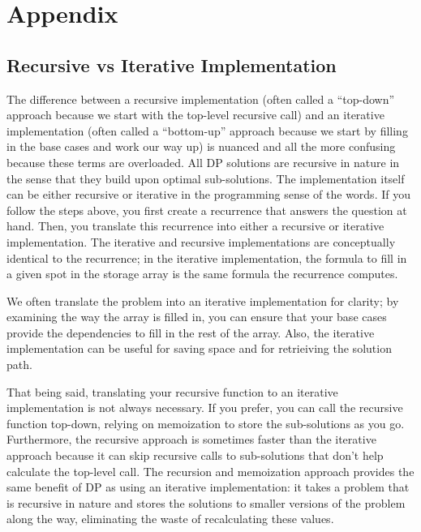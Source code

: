 \documentclass[11pt]{article}
\begin{document}
\setcounter{section}{1}
\renewcommand{\thesection}{\Alph{section}}
\section*{Appendix}
\subsection{Recursive vs Iterative Implementation}
\label{sec:implementation}
The difference between a recursive implementation (often called a ``top-down'' approach because we start with the top-level recursive call) and an iterative implementation (often called a ``bottom-up'' approach because we start by filling in the base cases and work our way up) is nuanced and all the more confusing because these terms are overloaded. All DP solutions are recursive in nature in the sense that they build upon optimal sub-solutions. The implementation itself can be either recursive or iterative in the programming sense of the words. If you follow the steps above, you first create a recurrence that answers the question at hand. Then, you translate this recurrence into either a recursive or iterative implementation. The iterative and recursive implementations are conceptually identical to the recurrence; in the iterative implementation, the formula to fill in a given spot in the storage array is the same formula the recurrence computes. 

We often translate the problem into an iterative implementation for clarity; by examining the way the array is filled in, you can ensure that your base cases provide the dependencies to fill in the rest of the array. Also, the iterative implementation can be useful for saving space and for retrieiving the solution path. 

That being said, translating your recursive function to an iterative implementation is not always necessary. If you prefer, you can call the recursive function top-down, relying on memoization to store the sub-solutions as you go. Furthermore, the recursive approach is sometimes faster than the iterative approach because it can skip recursive calls to sub-solutions that don't help calculate the top-level call. The recursion and memoization approach provides the same benefit of DP as using an iterative implementation: it takes a problem that is recursive in nature and stores the solutions to smaller versions of the problem along the way, eliminating the waste of recalculating these values.
\end{document}
